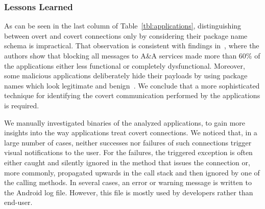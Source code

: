 \subsubsection{Lessons Learned}
As can be seen in the last column of Table~\ref{tbl:applications}, distinguishing between overt and covert connections only by considering their package name schema is impractical.  
That observation is consistent with findings in~\cite{Hornyack:Han:Jung:Schechter:Wetherall:CCS11}, where the authors 
show that blocking all messages to A\&A services made more than 60\% of the applications either less functional or completely dysfunctional. 
Moreover, some malicious applications deliberately hide their payloads by using package names which look legitimate and benign~\cite{Zhou:Jiang:SP2012}. We conclude that a more sophisticated 
technique for identifying the covert communication performed by the applications is required. 

We manually investigated binaries of the analyzed applications, to gain more insights into the way applications treat covert connections. %
We noticed that, in a large number of cases, neither successes nor failures of such connections trigger visual notifications to the user. 
For the failures, the triggered exception is often either caught and silently ignored in the method that issues the connection or, more commonly, propagated upwards in the call stack and then ignored by one of the calling methods. In several cases, an error or warning message is written to the Android log file. However, this file is mostly used by developers rather than end-user.












